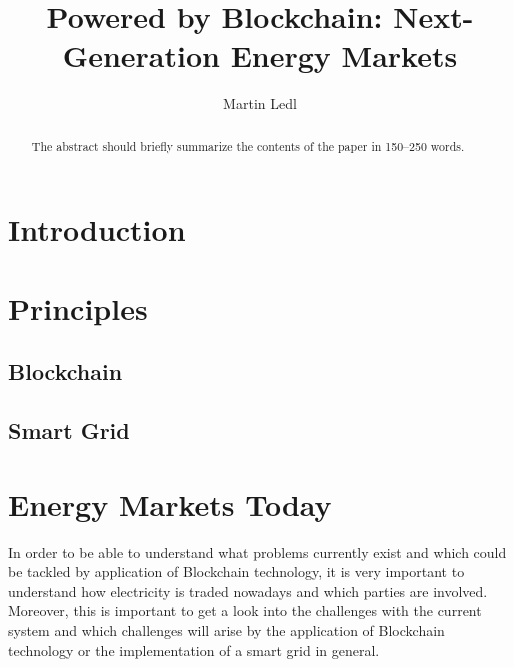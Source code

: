 \documentclass[runningheads]{llncs}
\begin{document}
%
\title{Powered by Blockchain: Next-Generation Energy Markets}
%
%
\author{Martin Ledl}
%
%
%
\maketitle              %
%
\begin{abstract}
The abstract should briefly summarize the contents of the paper in
150--250 words.

\end{abstract}
%
%
%
\section{Introduction}

\section{Principles}

\subsection{Blockchain}

\subsection{Smart Grid}

\section{Energy Markets Today}
In order to be able to understand what problems currently exist and which could be tackled by application of Blockchain technology, it is very important to understand how electricity is traded nowadays and which parties are involved. Moreover, this is important to get a look into the challenges with the current system and which challenges will arise by the application of Blockchain technology or the implementation of a smart grid in general.
\end{document}

